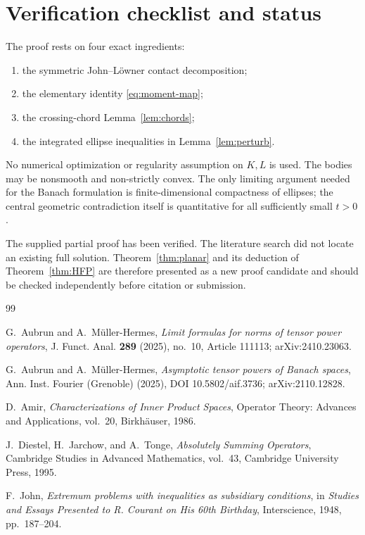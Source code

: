 \documentclass[11pt]{amsart}
\theoremstyle{definition}
\theoremstyle{remark}
\begin{document}
\section{Verification checklist and status}

The proof rests on four exact ingredients:
\begin{enumerate}[label=(\roman*)]
 \item the symmetric John--L\"owner contact decomposition;
 \item the elementary identity \eqref{eq:moment-map};
 \item the crossing-chord Lemma~\ref{lem:chords};
 \item the integrated ellipse inequalities in Lemma~\ref{lem:perturb}.
\end{enumerate}
No numerical optimization or regularity assumption on $K,L$ is used.  The
bodies may be nonsmooth and non-strictly convex.  The only limiting argument
needed for the Banach formulation is finite-dimensional compactness of
ellipses; the central geometric contradiction itself is quantitative for all
sufficiently small $t>0$.

The supplied partial proof has been verified.  The literature search did not
locate an existing full solution.  Theorem~\ref{thm:planar} and its deduction
of Theorem~\ref{thm:HFP} are therefore presented as a new proof candidate and
should be checked independently before citation or submission.

\begin{thebibliography}{99}

G.~Aubrun and A.~M\"uller-Hermes,
\emph{Limit formulas for norms of tensor power operators},
J. Funct. Anal. \textbf{289} (2025), no.~10, Article 111113;
arXiv:2410.23063.

G.~Aubrun and A.~M\"uller-Hermes,
\emph{Asymptotic tensor powers of Banach spaces},
Ann. Inst. Fourier (Grenoble) (2025), DOI 10.5802/aif.3736;
arXiv:2110.12828.

D.~Amir,
\emph{Characterizations of Inner Product Spaces},
Operator Theory: Advances and Applications, vol.~20,
Birkh\"auser, 1986.

J.~Diestel, H.~Jarchow, and A.~Tonge,
\emph{Absolutely Summing Operators},
Cambridge Studies in Advanced Mathematics, vol.~43,
Cambridge University Press, 1995.

F.~John,
\emph{Extremum problems with inequalities as subsidiary conditions},
in \emph{Studies and Essays Presented to R. Courant on His 60th Birthday},
Interscience, 1948, pp.~187--204.

\end{thebibliography}
\end{document}
